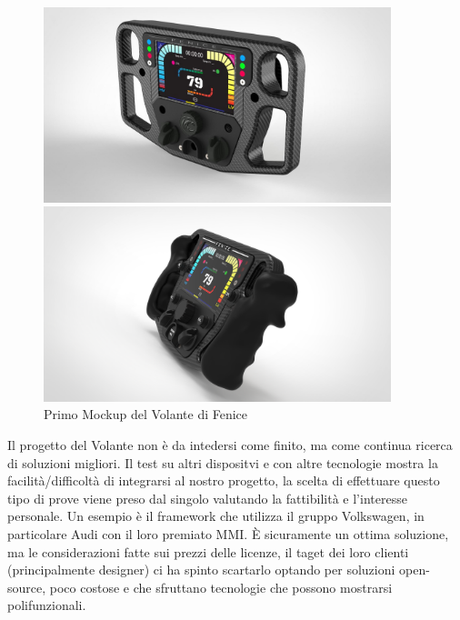 \begin{figure}[h!]
    \centering
    \begin{minipage}{0.5\textwidth}
        \centering
        \includegraphics[width=0.9\textwidth]{./figures/volanteFenice.jpg}
    \end{minipage}\hfill
    \begin{minipage}{0.5\textwidth}
        \centering
        \includegraphics[width=0.9\textwidth]{./figures/volanteFenice1.png}
    \end{minipage}
    \caption{Primo Mockup del Volante di Fenice}
\end{figure}



Il progetto del Volante non è da intedersi come finito, ma come continua ricerca di soluzioni migliori.
Il test su altri dispositvi e con altre tecnologie mostra la facilità/difficoltà di integrarsi al nostro progetto, 
la scelta di effettuare questo tipo di prove viene preso dal singolo valutando la fattibilità e l'interesse personale.
Un esempio è il framework che utilizza il gruppo Volkswagen, in particolare Audi con il loro premiato MMI. È sicuramente un ottima soluzione, ma le considerazioni fatte sui prezzi delle licenze,
il taget dei loro clienti (principalmente designer) ci ha spinto scartarlo optando per soluzioni open-source, poco costose e che sfruttano tecnologie che possono mostrarsi polifunzionali. 

